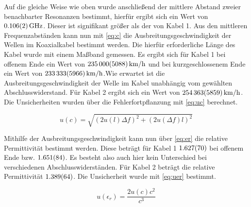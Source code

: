 Auf die gleiche Weise wie oben wurde anschließend der mittlere Abstand zweier benachbarter Resonanzen bestimmt, hierfür ergibt sich ein Wert von $\SI{0,106\pm0,002}{GHz}$. Dieser ist signifikant größer als der von Kabel 1. Aus den mittleren Frequenzabständen kann nun mit \cref{eq:c} die Ausbreitungsgeschwindigkeit der Wellen im Koaxialkabel bestimmt werden. Die hierfür erforderliche Länge des Kabel wurde mit einem Maßband gemessen. Es ergibt sich für Kabel 1 bei offenem Ende ein Wert von $\SI{235000\pm5088}{km/h}$ und bei kurzgeschlossenem Ende ein Wert von $\SI{233333\pm5966}{km/h}$.Wie erwartet ist die Ausbreitungsgeschwindigkeit der Welle im Kabel unabhängig vom gewählten Abschlusswiderstand. Für Kabel 2 ergibt sich ein Wert von $\SI{254363\pm5859}{km/h}$. Die Unsicherheiten wurden über die Fehlerfortpflanzung mit \cref{eq:uc} berechnet.

\begin{equation}
	u(c) = \sqrt{\left( 2u(l)\Delta f\right) ^2 +\left( 2u(\Delta f)l\right) ^2}
	\label{eq:uc}
\end{equation}

Mithilfe der Ausbreitungsgeschwindigkeit kann nun über \cref{eq:er} die relative Permittivität bestimmt werden. Diese beträgt für Kabel 1 $\SI{1,627\pm0,070}{}$ bei offenem Ende bzw. $\SI{1,651\pm0,084}{}$. Es besteht also auch hier kein Unterschied bei verschiedenen Abschlusswiderständen. Für Kabel 2 beträgt die relative Permittivität $\SI{1,389\pm0,064}{}$. Die Unsicherheit wurde mit \cref{eq:uer} bestimmt.

\begin{equation}
	u(\epsilon_r) = \frac{2u(c)c^2}{c^3}
	\label{eq:uer}
\end{equation}